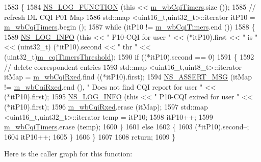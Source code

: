 \begin{DoxyCode}
1583 \{
1584   \hyperlink{log-macros-disabled_8h_a90b90d5bad1f39cb1b64923ea94c0761}{NS\_LOG\_FUNCTION} (\textcolor{keyword}{this} << \hyperlink{classns3_1_1MmWaveRrMacScheduler_ae70383b2b2b66701ea96205d5ad60c41}{m\_wbCqiTimers}.size ());
1585   \textcolor{comment}{// refresh DL CQI P01 Map}
1586   std::map <uint16\_t,uint32\_t>::iterator itP10 = \hyperlink{classns3_1_1MmWaveRrMacScheduler_ae70383b2b2b66701ea96205d5ad60c41}{m\_wbCqiTimers}.begin ();
1587   \textcolor{keywordflow}{while} (itP10 != \hyperlink{classns3_1_1MmWaveRrMacScheduler_ae70383b2b2b66701ea96205d5ad60c41}{m\_wbCqiTimers}.end ())
1588     \{
1589       \hyperlink{group__logging_gafbd73ee2cf9f26b319f49086d8e860fb}{NS\_LOG\_INFO} (\textcolor{keyword}{this} << \textcolor{stringliteral}{" P10-CQI for user "} << (*itP10).first << \textcolor{stringliteral}{" is "} << (uint32\_t)
      (*itP10).second << \textcolor{stringliteral}{" thr "} << (uint32\_t)\hyperlink{classns3_1_1MmWaveRrMacScheduler_a21360d09f2e5e4b9fc304752aef8ae6a}{m\_cqiTimersThreshold});
1590       \textcolor{keywordflow}{if} ((*itP10).second == 0)
1591         \{
1592           \textcolor{comment}{// delete correspondent entries}
1593           std::map <uint16\_t,uint8\_t>::iterator itMap = \hyperlink{classns3_1_1MmWaveRrMacScheduler_ab048c846f6d5d71795b65b9f91c6766a}{m\_wbCqiRxed}.find ((*itP10).first);
1594           \hyperlink{assert_8h_aff5ece9066c74e681e74999856f08539}{NS\_ASSERT\_MSG} (itMap != \hyperlink{classns3_1_1MmWaveRrMacScheduler_ab048c846f6d5d71795b65b9f91c6766a}{m\_wbCqiRxed}.end (), \textcolor{stringliteral}{" Does not find CQI report
       for user "} << (*itP10).first);
1595           \hyperlink{group__logging_gafbd73ee2cf9f26b319f49086d8e860fb}{NS\_LOG\_INFO} (\textcolor{keyword}{this} << \textcolor{stringliteral}{" P10-CQI exired for user "} << (*itP10).first);
1596           \hyperlink{classns3_1_1MmWaveRrMacScheduler_ab048c846f6d5d71795b65b9f91c6766a}{m\_wbCqiRxed}.erase (itMap);
1597           std::map <uint16\_t,uint32\_t>::iterator temp = itP10;
1598           itP10++;
1599           \hyperlink{classns3_1_1MmWaveRrMacScheduler_ae70383b2b2b66701ea96205d5ad60c41}{m\_wbCqiTimers}.erase (temp);
1600         \}
1601       \textcolor{keywordflow}{else}
1602         \{
1603           (*itP10).second--;
1604           itP10++;
1605         \}
1606     \}
1607 
1608   \textcolor{keywordflow}{return};
1609 \}
\end{DoxyCode}


Here is the caller graph for this function\+:


